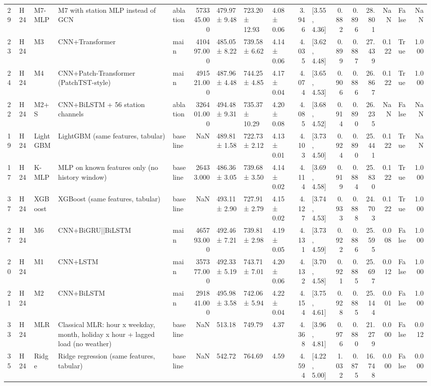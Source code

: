 \begin{tabular}{lllllrlllrlrrrrlr}
29 & H24 & M7-MLP & M7 with station MLP instead of GCN & ablation & 573345.000 & 479.97 ± 9.48 & 723.20 ± 12.93 & 4.08 ± 0.06 & 3.946 & [3.55, 4.36] & 0.882 & 0.896 & 28.801 & NaN & False & NaN \\
23 & H24 & M3 & CNN+Transformer & main & 410497.000 & 485.05 ± 8.22 & 739.58 ± 6.62 & 4.14 ± 0.06 & 4.035 & [3.62, 4.48] & 0.899 & 0.887 & 27.439 & 0.122 & True & 1.000 \\
24 & H24 & M4 & CNN+Patch-Transformer (PatchTST-style) & main & 491521.000 & 487.96 ± 4.48 & 744.25 ± 4.85 & 4.17 ± 0.04 & 4.074 & [3.65, 4.53] & 0.906 & 0.886 & 26.867 & 0.122 & True & 1.000 \\
22 & H24 & M2+S & CNN+BiLSTM + 56 station channels & ablation & 326401.000 & 494.48 ± 9.31 & 735.37 ± 10.29 & 4.20 ± 0.08 & 4.085 & [3.68, 4.52] & 0.914 & 0.890 & 26.235 & NaN & False & NaN \\
19 & H24 & LightGBM & LightGBM (same features, tabular) & baseline & NaN & 489.81 ± 1.58 & 722.73 ± 2.12 & 4.13 ± 0.01 & 4.103 & [3.73, 4.50] & 0.924 & 0.890 & 25.441 & 0.122 & True & NaN \\
17 & H24 & K-MLP & MLP on known features only (no history window) & baseline & 26433.000 & 486.36 ± 3.05 & 739.68 ± 3.50 & 4.14 ± 0.02 & 4.114 & [3.69, 4.58] & 0.919 & 0.884 & 25.830 & 0.122 & True & 1.000 \\
37 & H24 & XGBoost & XGBoost (same features, tabular) & baseline & NaN & 493.11 ± 2.90 & 727.91 ± 2.79 & 4.15 ± 0.02 & 4.127 & [3.74, 4.53] & 0.933 & 0.888 & 24.703 & 0.122 & True & 1.000 \\
27 & H24 & M6 & CNN+BiGRU||BiLSTM & main & 465793.000 & 492.46 ± 7.21 & 739.81 ± 2.98 & 4.19 ± 0.05 & 4.131 & [3.73, 4.59] & 0.922 & 0.886 & 25.595 & 0.008 & False & 1.000 \\
20 & H24 & M1 & CNN+LSTM & main & 357377.000 & 492.33 ± 5.19 & 743.71 ± 7.01 & 4.20 ± 0.06 & 4.132 & [3.70, 4.58] & 0.921 & 0.885 & 25.697 & 0.012 & False & 1.000 \\
21 & H24 & M2 & CNN+BiLSTM & main & 291841.000 & 495.98 ± 3.58 & 742.06 ± 5.94 & 4.22 ± 0.04 & 4.154 & [3.75, 4.61] & 0.928 & 0.885 & 25.144 & 0.001 & False & 1.000 \\
33 & H24 & MLR & Classical MLR: hour x weekday, month, holiday x hour + lagged load (no weather) & baseline & NaN & 513.18 & 749.79 & 4.37 & 4.368 & [3.96, 4.81] & 0.976 & 0.880 & 21.279 & 0.000 & False & 0.012 \\
35 & H24 & Ridge & Ridge regression (same features, tabular) & baseline & NaN & 542.72 & 764.69 & 4.59 & 4.594 & [4.22, 5.00] & 1.032 & 0.875 & 16.748 & 0.000 & False & 0.000 \\

\end{tabular}
